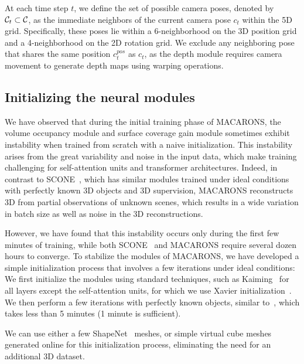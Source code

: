 At each time step $t$, we define the set of possible camera poses, denoted by ${\cal C}_t \subset {\cal C}$, as the immediate neighbors of the current camera pose $c_t$ within the 5D grid. Specifically, these poses lie within a 6-neighborhood on the 3D position grid and a 4-neighborhood on the 2D rotation grid. We exclude any neighboring pose that shares the same position $c^{pos}_t$ as $c_t$, as the depth module requires camera movement to generate depth maps using warping operations.

\subsection{Initializing the neural modules}

We have observed that during the initial training phase of MACARONS, the volume occupancy module and surface coverage gain module sometimes exhibit instability when trained from scratch with a naive initialization. 
This instability arises from the great variability and noise in the input data, which make training challenging for self-attention units and transformer architectures. Indeed, in contrast to SCONE~\cite{guedon-nips22-scone-surface-coverage}, which has similar modules trained under ideal conditions with perfectly known 3D objects and 3D supervision, MACARONS reconstructs 3D from partial observations of unknown scenes, which results in a wide variation in batch size as well as noise in the 3D reconstructions.

However, we have found that this instability occurs only during the first few minutes of training, while both SCONE~\cite{guedon-nips22-scone-surface-coverage} and MACARONS require several dozen hours to converge. 
%
To stabilize the modules of MACARONS, we have developed a simple initialization process that involves a few iterations under ideal conditions: We first initialize the modules using standard techniques, such as Kaiming~\cite{he-iccv15-delvingdeepintorectifiers} for all layers except the self-attention units, for which we use Xavier initialization~\cite{glorot-10-understandingthedifficulty}. 
%
We then perform a few iterations with perfectly known objects, similar to~\cite{guedon-nips22-scone-surface-coverage}, which takes less than 5 minutes (1 minute is sufficient). 

We can use either a few ShapeNet~\cite{chang-15-shapenet} meshes, or simple virtual cube meshes generated online for this initialization process, eliminating the need for an additional 3D dataset.

